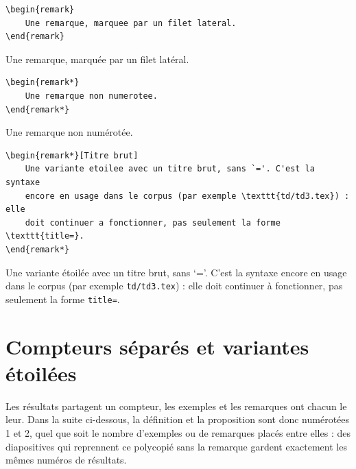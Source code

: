 \begin{lstlisting}
\begin{remark}
    Une remarque, marquee par un filet lateral.
\end{remark}
\end{lstlisting}
\begin{remark}
    Une remarque, marquée par un filet latéral.
\end{remark}

\begin{lstlisting}
\begin{remark*}
    Une remarque non numerotee.
\end{remark*}
\end{lstlisting}
\begin{remark*}
    Une remarque non numérotée.
\end{remark*}

\begin{lstlisting}
\begin{remark*}[Titre brut]
    Une variante etoilee avec un titre brut, sans `='. C'est la syntaxe
    encore en usage dans le corpus (par exemple \texttt{td/td3.tex}) : elle
    doit continuer a fonctionner, pas seulement la forme \texttt{title=}.
\end{remark*}
\end{lstlisting}
\begin{remark*}
    Une variante étoilée avec un titre brut, sans `='. C'est la syntaxe
    encore en usage dans le corpus (par exemple \texttt{td/td3.tex}) : elle
    doit continuer à fonctionner, pas seulement la forme \texttt{title=}.
\end{remark*}

\section{Compteurs séparés et variantes étoilées}%
\label{sec:counters}

Les résultats partagent un compteur, les exemples et les remarques ont chacun
le leur. Dans la suite ci-dessous, la définition et la proposition sont donc
numérotées 1 et 2, quel que soit le nombre d'exemples ou de remarques placés
entre elles : des diapositives qui reprennent ce polycopié sans la remarque
gardent exactement les mêmes numéros de résultats.

